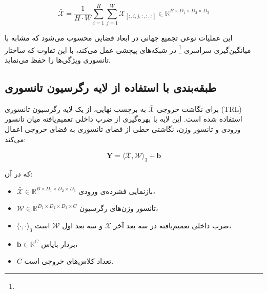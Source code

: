 \begin{equation}
	\bar{\mathcal{X}} = \frac{1}{H \cdot W} \sum_{i=1}^{H} \sum_{j=1}^{W} \mathcal{X}_{[:, i, j, :, :, :]}
	\in \mathbb{R}^{B \times D_1 \times D_2 \times D_3}
\end{equation}

این عملیات نوعی تجمیع جهانی در ابعاد فضایی محسوب می‌شود که مشابه با میانگین‌گیری سراسری \footnote{} در شبکه‌های پیچشی عمل می‌کند، با این تفاوت که ساختار تانسوری ویژگی‌ها را حفظ می‌نماید.

\subsection{طبقه‌بندی با استفاده از لایه رگرسیون تانسوری}

برای نگاشت خروجی $\bar{\mathcal{X}}$ به برچسب نهایی، از یک لایه رگرسیون تانسوری (TRL) استفاده شده است. این لایه با بهره‌گیری از ضرب داخلی تعمیم‌یافته میان تانسور ورودی و تانسور وزن، نگاشتی خطی از فضای تانسوری به فضای خروجی اعمال می‌کند:

\begin{equation}
	\mathbf{Y} = \langle \bar{\mathcal{X}}, \mathcal{W} \rangle_3 + \mathbf{b}
\end{equation}

که در آن:
\begin{itemize}
	\item $\bar{\mathcal{X}} \in \mathbb{R}^{B \times D_1 \times D_2 \times D_3}$ بازنمایی فشرده‌ی ورودی،
	\item $\mathcal{W} \in \mathbb{R}^{D_1 \times D_2 \times D_3 \times C}$ تانسور وزن‌های رگرسیون،
	\item $\langle \cdot, \cdot \rangle_3$ ضرب داخلی تعمیم‌یافته در سه بعد آخر $\bar{\mathcal{X}}$ و سه بعد اول $\mathcal{W}$ است،
	\item $\mathbf{b} \in \mathbb{R}^{C}$ بردار بایاس،
	\item $C$ تعداد کلاس‌های خروجی است.
\end{itemize}